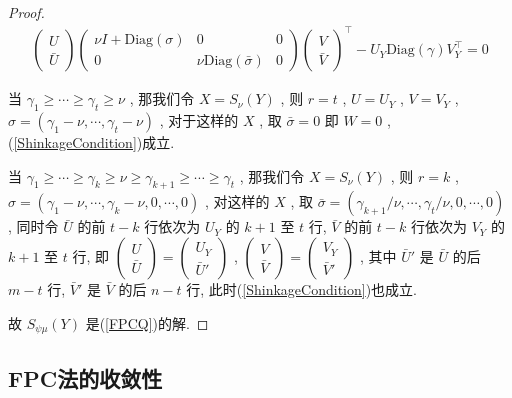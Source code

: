 \documentclass[UTF8]{ctexart}
\numberwithin{equation}{section}
\begin{document}
\begin{proof}
\begin{equation}
\begin{split}
\begin{pmatrix}
								U \\ \bar{U}
							\end{pmatrix}
							\begin{pmatrix}
								\nu I + \text{Diag}(\sigma) & 0 & 0\\
								0 & \nu \text{Diag}(\bar{\sigma}) & 0
							\end{pmatrix}
							\begin{pmatrix}
								V \\ \bar{V}
							\end{pmatrix} ^\top 
							- U_Y \text{Diag}(\gamma) V_Y ^\top = 0
					\end{split}
				\end{equation}

				当 $\gamma_1 \ge \cdots \ge \gamma_t \ge \nu$ , 那我们令 $X = S_\nu(Y)$ , 则 $r = t$ , $U = U_Y$ , $V = V_Y$ , $\sigma = (\gamma_1 - \nu, \cdots, \gamma_t - \nu)$ , 对于这样的 $X$ , 取 $\bar{\sigma} = 0$ 即 $W = 0$ , (\ref{ShinkageCondition})成立.

				当 $\gamma_1 \ge \cdots \ge \gamma_k \ge \nu \ge \gamma_{k + 1} \ge \cdots \ge \gamma_t$ , 那我们令 $X = S_\nu(Y)$ , 则 $r = k$ , $\sigma = (\gamma_1 - \nu, \cdots, \gamma_k - \nu, 0, \cdots, 0)$ , 对这样的 $X$ , 取 $\bar{\sigma} = (\gamma_{k + 1}/\nu, \cdots, \gamma_{t}/\nu, 0, \cdots, 0)$ , 同时令 $\bar{U}$ 的前 $t - k$ 行依次为 $U_Y$ 的 $k + 1$ 至 $t$ 行, $\bar{V}$ 的前 $t - k$ 行依次为 $V_Y$ 的 $k + 1$ 至 $t$ 行, 即 
					$
						\begin{pmatrix}
							U \\ \bar{U}
						\end{pmatrix} 
						=
						\begin{pmatrix}
							U_Y \\ \bar{U}'
						\end{pmatrix}
					$ ,
					$
						\begin{pmatrix}
							V \\ \bar{V}
						\end{pmatrix} 
						=
						\begin{pmatrix}
							V_Y \\ \bar{V}'
						\end{pmatrix}
					$ ,
				其中 $\bar{U}'$ 是 $\bar{U}$ 的后 $m - t$ 行, $\bar{V}'$ 是 $\bar{V}$ 的后 $n - t$ 行, 此时(\ref{ShinkageCondition})也成立.

				故 $S_{\psi \mu}(Y)$ 是(\ref{FPCQ})的解.
			\end{proof}
		\subsection{FPC法的收敛性}
\end{document}
